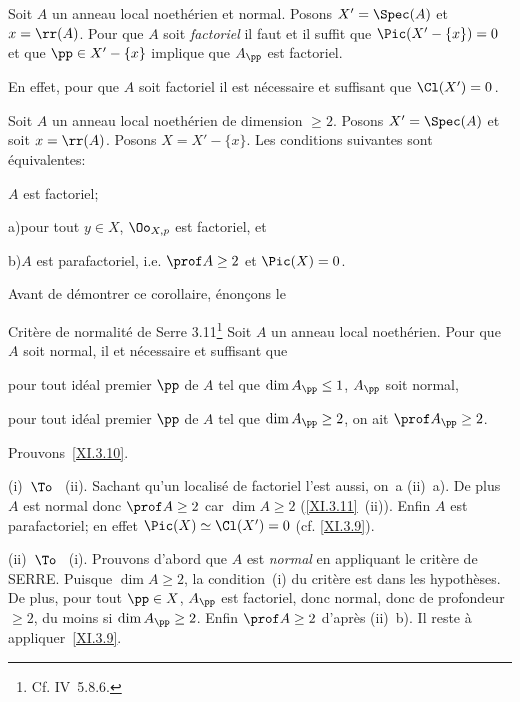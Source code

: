 \begin{corollaire} \label{XI.3.9}
Soit $A$ un anneau local noeth\'erien et normal. Posons $X'=\Spec(A)$ et $x = \rr(A)$. Pour que $A$ soit \emph{factoriel} il faut et il suffit que $\Pic(X'-\{x\})=0$ et que $\pp\in X'-\{x\}$ implique que $A_\pp$ est factoriel.
\end{corollaire}
En effet, pour que $A$ soit factoriel il est n\'ecessaire et suffisant que $\Cl(X')=0$\,.

\begin{corollaire} \label{XI.3.10}
Soit $A$ un anneau local noeth\'erien de dimension $\geq 2$. Posons $X'=\Spec(A)$ et soit $x = \rr(A)$. Posons $X=X'-\{x\}$. Les conditions suivantes sont \'equivalentes:
\begin{enumeratei}
\item
$A$ est factoriel;
\item
\textup{a)}\enspace pour tout $y\in X$, $\Oo_{X, p}$ est factoriel, et
\par\hspace*{6.3mm}\textup{b)}\enspace $A$ est parafactoriel, i.e. $\prof A\geq 2$ et $\Pic(X)=0$.
\end{enumeratei}
\end{corollaire}

Avant de d\'emontrer ce corollaire, \'enon\c cons le
\label{XI.3.11}
\begin{enonce*}{Crit\`ere de normalit\'e de Serre 3.11\footnote{Cf. \EGA IV~5.8.6.}} Soit $A$ un anneau local noeth\'erien. Pour que $A$ soit normal, il et n\'ecessaire et suffisant que
\begin{enumeratei}
\item
pour tout id\'eal premier ${\pp}$ de $A$ tel que $\dim A_{{\pp}}\leq 1$, $A_{{\pp}}$ soit normal,
\item
pour tout id\'eal premier ${\pp}$ de $A$ tel que $\dim A_{{\pp}}\geq 2$, on ait $\prof A_{{\pp}}\geq 2$.
\end{enumeratei}
\end{enonce*}

Prouvons~\ref{XI.3.10}.

(i)~$\To$~ (ii). Sachant qu'un localis\'e de factoriel l'est aussi, on~a (ii)~a). De plus $A$ est normal donc $\prof A\geq 2$ car $\dim A\geq 2$ (\ref{XI.3.11}~(ii)). Enfin $A$ est parafactoriel; en effet $\Pic(X)\simeq\Cl(X')=0$ (cf. \ref{XI.3.9}).

(ii)~$\To$~ (i). Prouvons d'abord que $A$ est \emph{normal} en appliquant le crit\`ere de SERRE. Puisque $\dim A\geq 2$, la condition~(i) du crit\`ere est dans les hypoth\`eses. De plus, pour tout ${\pp}\in X$, $A_{{\pp}}$ est factoriel, donc normal, donc de profondeur $\geq 2$, du moins si $\dim A_{{\pp}}\geq 2$. Enfin $\prof A\geq 2$ d'apr\`es (ii)~b). Il reste \`a appliquer~\ref{XI.3.9}.

